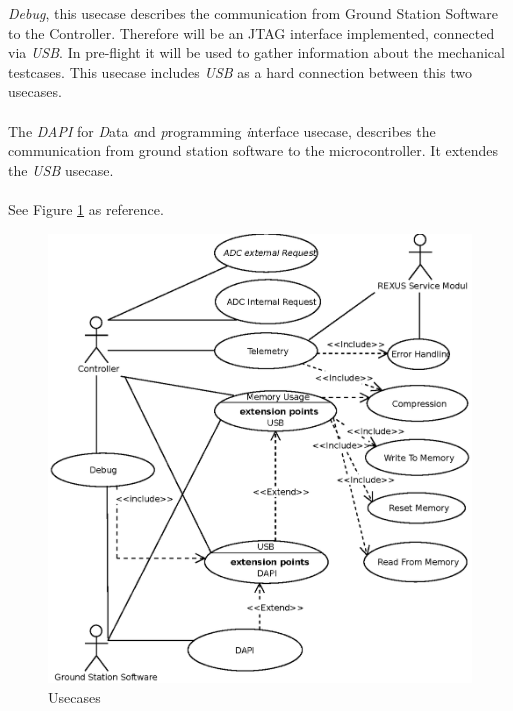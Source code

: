 \textit{Debug}, this usecase describes the communication from Ground Station Software to the Controller. Therefore will be an JTAG interface implemented, connected via \textit{USB}. In pre-flight it will be used to gather information about the mechanical testcases. This usecase includes \textit{USB} as a hard connection  between this two usecases. \\ \\
The \textit{DAPI} for \textit{D}ata \textit{a}nd \textit{p}rogramming  \textit{i}nterface usecase, describes the communication from ground station software to the microcontroller. It extendes the \textit{USB} usecase.\\ \\
See Figure \ref{fig:usecase} as reference. 
\pagebreak
\begin{figure}[H]
	\centering
	  \includegraphics{SoftwareDesign/HERMESS_USECASE.eps}
	\caption{Usecases}
	\label{fig:usecase}
\end{figure}
\pagebreak

